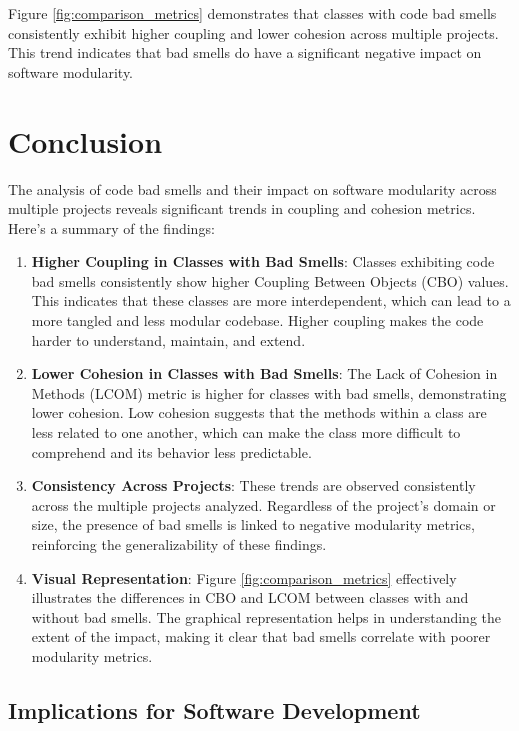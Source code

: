\documentclass[conference]{IEEEtran}
\begin{document}
Figure \ref{fig:comparison_metrics} demonstrates that classes with code bad smells consistently exhibit higher coupling and lower cohesion across multiple projects. This trend indicates that bad smells do have a significant negative impact on software modularity.

\section{Conclusion}

The analysis of code bad smells and their impact on software modularity across multiple projects reveals significant trends in coupling and cohesion metrics. Here's a summary of the findings:

\begin{enumerate}
    \item \textbf{Higher Coupling in Classes with Bad Smells}: Classes exhibiting code bad smells consistently show higher Coupling Between Objects (CBO) values. This indicates that these classes are more interdependent, which can lead to a more tangled and less modular codebase. Higher coupling makes the code harder to understand, maintain, and extend.
    
    \item \textbf{Lower Cohesion in Classes with Bad Smells}: The Lack of Cohesion in Methods (LCOM) metric is higher for classes with bad smells, demonstrating lower cohesion. Low cohesion suggests that the methods within a class are less related to one another, which can make the class more difficult to comprehend and its behavior less predictable.
    
    \item \textbf{Consistency Across Projects}: These trends are observed consistently across the multiple projects analyzed. Regardless of the project's domain or size, the presence of bad smells is linked to negative modularity metrics, reinforcing the generalizability of these findings.
    
    \item \textbf{Visual Representation}: Figure \ref{fig:comparison_metrics} effectively illustrates the differences in CBO and LCOM between classes with and without bad smells. The graphical representation helps in understanding the extent of the impact, making it clear that bad smells correlate with poorer modularity metrics.
\end{enumerate}

\subsection{Implications for Software Development}
\end{document}
